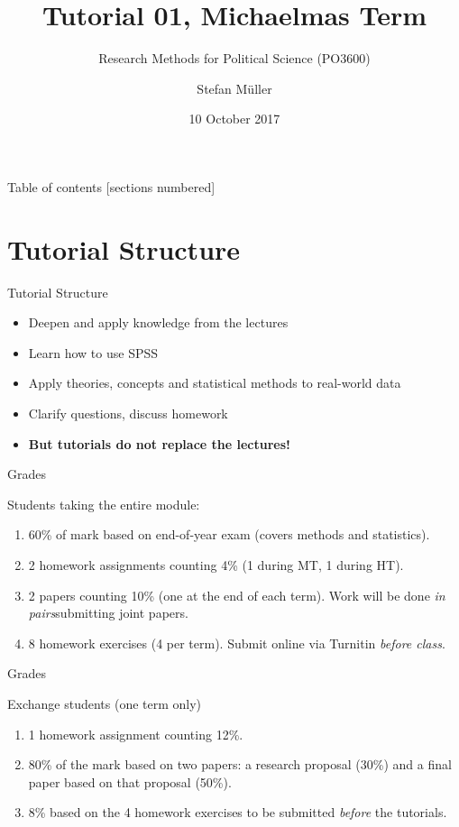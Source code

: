 \documentclass[10pt]{beamer}
\title{Tutorial 01, Michaelmas Term}
\subtitle{Research Methods for Political Science (PO3600)}
\date{10 October 2017}
\author{Stefan Müller}
\institute{Trinity College Dublin \\ \url{http://muellerstefan.net/research-methods}}
\begin{document}
\maketitle

\begin{frame}{Table of contents}
  [sections numbered]
  \tableofcontents%
\end{frame}

\section{Tutorial Structure}
\begin{frame}{Tutorial Structure}

\begin{itemize}
\item Deepen and apply knowledge from the lectures
\item Learn how to use SPSS
\item Apply theories, concepts and statistical methods to real-world data
\item Clarify questions, discuss homework
\item \textbf{But tutorials do not replace the lectures!}
\end{itemize}

\end{frame}

\begin{frame}{Grades}

Students taking the entire module:

\begin{enumerate}
\item 60\% of mark based on end-of-year exam (covers methods and statistics).
\item 2 homework assignments counting 4\% (1 during MT, 1 during HT).
\item 2 papers counting 10\% (one at the end of each term). Work will be done \textit{in pairs}submitting joint papers.
\item 8 homework exercises (4 per term). Submit online via Turnitin \textit{before class}.
\end{enumerate}
\end{frame}

\begin{frame}{Grades}

Exchange students (one term only)
\begin{enumerate}
\item 1 homework assignment counting 12\%.
\item 80\% of the mark based on two papers: a research proposal (30\%) and a final paper based on that proposal (50\%).
\item 8\% based on the 4 homework exercises to be submitted \textit{before} the tutorials.
\end{enumerate}
\end{frame}
\end{document}
